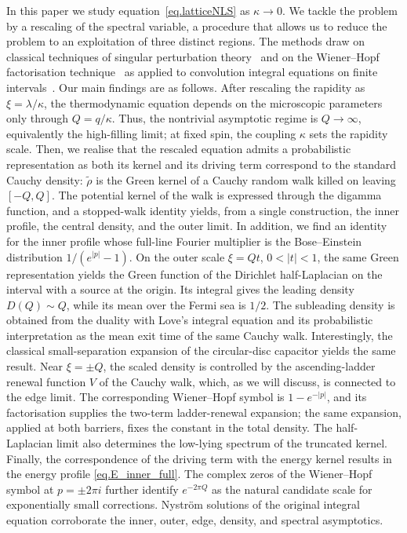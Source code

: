 \documentclass[11pt,a4paper]{article}
\theoremstyle{definition}
\begin{document}
In this paper we study equation~\eqref{eq.latticeNLS} as $\kappa\to 0$.
We tackle the problem by a rescaling of the spectral variable, a procedure that allows us to  
reduce the problem to an exploitation of three distinct regions. 
The methods draw on classical techniques of singular perturbation
theory~\cite{VanDyke1975,BenderOrszag1999,Hinch1991,Lagerstrom1988} and on the
Wiener--Hopf factorisation technique~\cite{Noble1958,Krein1958,GohbergKrein1958}
as applied to convolution integral equations on finite
intervals~\cite{Sakhnovich2015}. 
Our main findings are as follows.  After rescaling the rapidity as
$\xi=\lambda/\kappa$, the thermodynamic equation depends on the microscopic
parameters only through $Q=q/\kappa$.  Thus, the nontrivial asymptotic regime is
$Q\to\infty$, equivalently the high-filling limit; at fixed spin, the coupling
$\kappa$  sets the rapidity scale. Then, we realise that the rescaled equation admits a
probabilistic representation as both its kernel and its driving term correspond to 
the standard Cauchy density: $\tilde\rho$ is the Green kernel of a Cauchy random
walk killed on leaving $[-Q,Q]$.  The potential kernel of the walk is expressed
through the digamma function, and a stopped-walk identity yields, from a
single construction, the inner profile, the central density, and the outer
limit. 
In addition, we find an identity for the inner profile 
whose full-line Fourier multiplier is the Bose--Einstein distribution
$1/(e^{|p|}-1)$.  On the outer scale $\xi=Qt$, $0<|t|<1$, the same Green
representation yields  the Green function of the Dirichlet half-Laplacian on the
interval with a source at the origin.  Its integral gives the leading density
$D(Q)\sim Q$, while its mean over the Fermi sea is $1/2$.
The subleading density is obtained from the duality with Love's integral
equation and its probabilistic interpretation as the mean exit time of the same
Cauchy walk. Interestingly, the classical small-separation expansion of the circular-disc
capacitor yields the same result. Near
$\xi=\pm Q$, the scaled density is controlled by the ascending-ladder renewal
function $V$ of the Cauchy walk, which, as we will discuss, is connected to the edge limit. 
The corresponding Wiener--Hopf symbol is $1-e^{-|p|}$, and its factorisation
supplies the two-term ladder-renewal expansion; the same expansion, applied at
both barriers, fixes the constant in the total density.
The half-Laplacian limit also determines the low-lying spectrum of the
truncated kernel.
Finally, the correspondence of the driving term with the energy kernel
results in the energy profile \eqref{eq.E_inner_full}.
The complex zeros of the Wiener--Hopf symbol at $p=\pm2\pi i$ further identify
$e^{-2\pi Q}$ as the natural candidate scale for exponentially small
corrections. Nystr\"om solutions of the original
integral equation corroborate the inner, outer, edge, density, and spectral
asymptotics.
\end{document}
